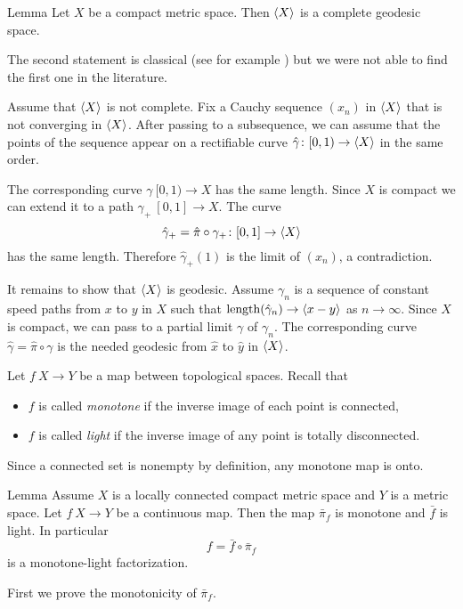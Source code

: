 \documentclass{article}
\begin{document}
\begin{thm}{Lemma}\label{lem:geospace}
Let $X$ be a compact metric space. 
Then $\langle X\rangle$ is a complete geodesic space.
\end{thm}

The second statement is classical (see for example \cite[II-\S8 Thm. 3]{KF}) but 
we were not able to find the first one in the literature.

Assume that $\langle X\rangle$ is not complete.
Fix a Cauchy sequence $(x_n)$ in $\langle X\rangle$ that is not converging in $\langle X\rangle$.
After passing to a subsequence, we can assume that the points of the sequence appear on a rectifiable curve $\hat\gamma\:[0,1)\zz\to\<X\>$ in the same order.

The corresponding curve $\gamma\:[0,1)\to X$ has the same length.
Since $X$ is compact we can extend it to a path $\gamma_+\:[0,1]\to X$.
The curve 
\[\hat\gamma_+=\hat\pi\circ\gamma_+\colon[0,1]\to\langle X\rangle\]
has the same length.
Therefore $\hat\gamma_+(1)$ is the limit of $(x_n)$, a contradiction.

It remains to show that $\langle X\rangle$ is geodesic.
Assume $\gamma_n$ is a sequence of constant speed paths from $x$ to $y$ in $X$
such that $\mathop{\rm length}\nolimits(\hat\gamma_n)\to \langle x-y\rangle$ as $n\to\infty$.
Since $X$ is compact, we can pass to a partial limit $\gamma$ of  $\gamma_n$.
The corresponding curve $\hat\gamma=\hat \pi\circ\gamma$ is the needed geodesic from $\hat x$ to $\hat y$ in $\langle X\rangle$.
\qeds

Let $f\:X\to Y$ be a map between topological spaces.
Recall that 
\begin{itemize}
\item $f$ is called \emph{monotone} if the inverse image of each point is connected,
 \item $f$ is called \emph{light} if the inverse image of any point is totally disconnected.
\end{itemize}
Since a connected set is nonempty by definition, any monotone map is onto.

\begin{thm}{Lemma}\label{cor:fiberconnected}
Assume $X$ is a locally connected compact metric space and $Y$ is a metric space.
Let $f\:X\to Y$ be a continuous map.
Then the map $\bar \pi_f$ is monotone and $\bar f$ is light.
In particular 
\[f=\bar f\circ\bar\pi_f\]
is a monotone-light factorization. 
\end{thm}

First we prove the monotonicity of $\bar\pi_f$.
\end{document}
